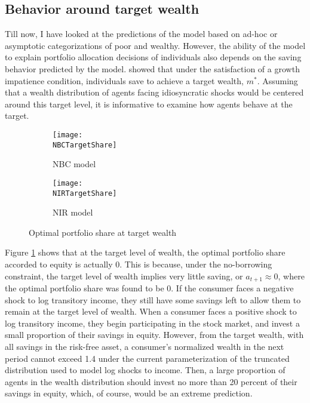 \subsection{Behavior around target wealth}\label{target_wealth}

Till now, I have looked at the predictions of the model based on ad-hoc or asymptotic categorizations of poor and wealthy. However, the ability of the model to explain portfolio allocation decisions of individuals also depends on the saving behavior predicted by the model. \citet{Deaton1991} showed that under the satisfaction of a growth impatience condition, individuals save to achieve a target wealth, $m^*$. Assuming that a wealth distribution of agents facing idiosyncratic shocks would be centered around this target level, it is informative to examine how agents behave at the target.

\begin{figure}[h]
    \centering
    \begin{subfigure}{0.49\textwidth}
        \centering
        \texttt{[image: \\NBCTargetShare]}
        \caption{NBC model}
        \label{subfig:targetShare_NBC}
    \end{subfigure}
    \begin{subfigure}{0.49\textwidth}
        \centering
        \texttt{[image: \\NIRTargetShare]}
        \caption{NIR model}
        \label{subfig:targetShare_NIR}
    \end{subfigure}
    \caption{Optimal portfolio share at target wealth}
    \label{fig:targetShare}
\end{figure}

Figure \ref{subfig:targetShare_NBC} shows that at the target level of wealth, the optimal portfolio share accorded to equity is actually 0. This is because, under the no-borrowing constraint, the target level of wealth implies very little saving, or $a_{t+1} \approx 0$, where the optimal portfolio share was found to be $0$. If the consumer faces a negative shock to log transitory income, they still have some savings left to allow them to remain at the target level of wealth. When a consumer faces a positive shock to log transitory income, they begin participating in the stock market, and invest a small proportion of their savings in equity. However, from the target wealth, with all savings in the risk-free asset, a consumer's normalized wealth in the next period cannot exceed 1.4 under the current parameterization of the truncated distribution used to model log shocks to income. Then, a large proportion of agents in the wealth distribution should invest no more than 20 percent of their savings in equity, which, of course, would be an extreme prediction.

